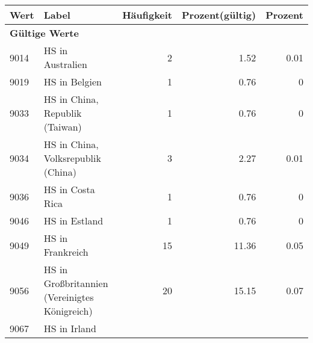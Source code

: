     \begin{longtable}{lXrrr}
     \toprule
     \textbf{Wert} & \textbf{Label} & \textbf{Häufigkeit} & \textbf{Prozent(gültig)} & \textbf{Prozent} \\
     \endhead
     \midrule
     \multicolumn{5}{l}{\textbf{Gültige Werte}}\\
        9014 & \multicolumn{1}{X}{HS in Australien} & %
          \num{2} &
          \num[round-mode=places,round-precision=2]{1.52} &
          \num[round-mode=places,round-precision=2]{0.01} \\
        9019 & \multicolumn{1}{X}{HS in Belgien} & %
          \num{1} &
          \num[round-mode=places,round-precision=2]{0.76} &
          \num[round-mode=places,round-precision=2]{0} \\
        9033 & \multicolumn{1}{X}{HS in China, Republik (Taiwan)} & %
          \num{1} &
          \num[round-mode=places,round-precision=2]{0.76} &
          \num[round-mode=places,round-precision=2]{0} \\
        9034 & \multicolumn{1}{X}{HS in China, Volksrepublik (China)} & %
          \num{3} &
          \num[round-mode=places,round-precision=2]{2.27} &
          \num[round-mode=places,round-precision=2]{0.01} \\
        9036 & \multicolumn{1}{X}{HS in Costa Rica} & %
          \num{1} &
          \num[round-mode=places,round-precision=2]{0.76} &
          \num[round-mode=places,round-precision=2]{0} \\
        9046 & \multicolumn{1}{X}{HS in Estland} & %
          \num{1} &
          \num[round-mode=places,round-precision=2]{0.76} &
          \num[round-mode=places,round-precision=2]{0} \\
        9049 & \multicolumn{1}{X}{HS in Frankreich} & %
          \num{15} &
          \num[round-mode=places,round-precision=2]{11.36} &
          \num[round-mode=places,round-precision=2]{0.05} \\
        9056 & \multicolumn{1}{X}{HS in Großbritannien (Vereinigtes Königreich)} & %
          \num{20} &
          \num[round-mode=places,round-precision=2]{15.15} &
          \num[round-mode=places,round-precision=2]{0.07} \\
        9067 & \multicolumn{1}{X}{HS in Irland} & %

\end{longtable}
